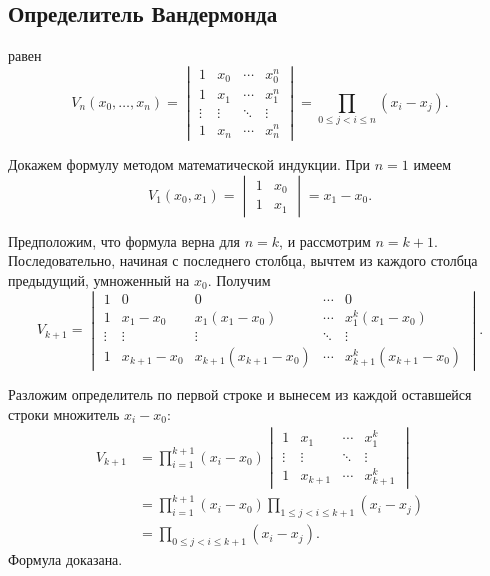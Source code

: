 \documentclass[../final.tex]{subfiles}
\begin{document}
\subsection{Определитель Вандермонда}

 равен
%
\begin{equation}
    V_n(x_0,\ldots,x_n)
    =\begin{vmatrix}
        1&x_0&\cdots&x_0^n\\
        1&x_1&\cdots&x_1^n\\
        \vdots&\vdots&\ddots&\vdots\\
        1&x_n&\cdots&x_n^n
    \end{vmatrix}
    =\prod_{0\le j<i\le n}(x_i-x_j).
    \label{eq:ovf_vandermonde}
\end{equation}

Докажем формулу методом математической индукции.
При $n=1$ имеем
%
\begin{equation*}
    V_1(x_0,x_1)=\begin{vmatrix}1&x_0\\1&x_1\end{vmatrix}=x_1-x_0.
\end{equation*}

Предположим, что формула верна для $n=k$, и рассмотрим $n=k+1$.
Последовательно, начиная с последнего столбца, вычтем из каждого
столбца предыдущий, умноженный на $x_0$. Получим
%
\begin{equation*}
    V_{k+1}
    =\begin{vmatrix}
        1&0&0&\cdots&0\\
        1&x_1-x_0&x_1(x_1-x_0)&\cdots&x_1^k(x_1-x_0)\\
        \vdots&\vdots&\vdots&\ddots&\vdots\\
        1&x_{k+1}-x_0&x_{k+1}(x_{k+1}-x_0)&\cdots&x_{k+1}^k(x_{k+1}-x_0)
    \end{vmatrix}.
\end{equation*}

Разложим определитель по первой строке и вынесем из каждой оставшейся
строки множитель $x_i-x_0$:
%
\begin{align*}
    V_{k+1}
    &=\prod_{i=1}^{k+1}(x_i-x_0)
    \begin{vmatrix}
        1&x_1&\cdots&x_1^k\\
        \vdots&\vdots&\ddots&\vdots\\
        1&x_{k+1}&\cdots&x_{k+1}^k
    \end{vmatrix}\\[3pt]
    &=\prod_{i=1}^{k+1}(x_i-x_0)
      \prod_{1\le j<i\le k+1}(x_i-x_j)\\
    &=\prod_{0\le j<i\le k+1}(x_i-x_j).
\end{align*}
%
Формула доказана.
\end{document}
